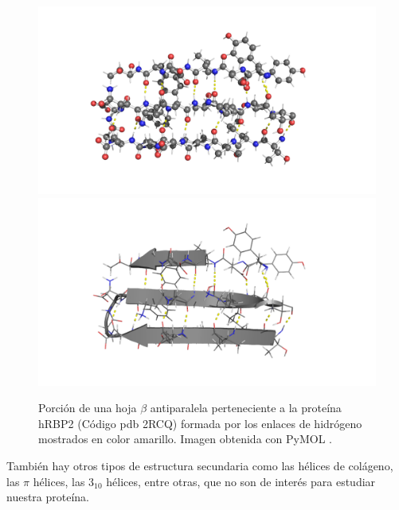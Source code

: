 \begin{figure}[H]
\centering
\includegraphics[scale=0.2]{Kap3/beta2.png}
\includegraphics[scale=0.2]{Kap3/beta.png}
\caption{Porci\'{o}n de una hoja $\beta$ antiparalela perteneciente a la prote\'{i}na hRBP2 (C\'{o}digo pdb 2RCQ) formada por los enlaces de hidr\'{o}geno mostrados en color amarillo. Imagen obtenida con PyMOL \cite{PyMOL}.}\label{fig:beta}
\end{figure}
Tambi\'{e}n hay otros tipos de estructura secundaria como las h\'{e}lices de col\'{a}geno, las $\pi$ h\'{e}lices, las $3_{10}$ h\'{e}lices, entre otras, que no son de inter\'{e}s para estudiar nuestra prote\'{i}na.\\

